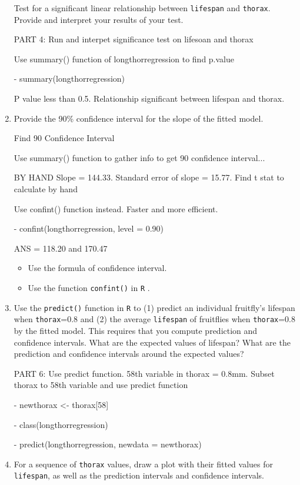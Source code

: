 \documentclass[12pt,letterpaper]{article}
\begin{document}
\begin{enumerate}
	Test for a significant linear relationship between  \texttt{lifespan} and \texttt{thorax}. Provide and interpret your results of your test.

PART 4: Run and interpet significance test on lifesoan and thorax

Use summary() function of longthorregression to find p.value

- summary(longthorregression)

 P value less than 0.5. Relationship significant between lifespan and thorax.
 	
\newpage
	\item
	
	Provide the 90\% confidence interval for the slope of the fitted model.
	
Find 90 Confidence Interval
	
Use summary() function to gather info to get 90 confidence interval...

BY HAND Slope = 144.33. Standard error of slope = 15.77. Find t stat to calculate by hand

Use confint() function instead. Faster and more efficient.
	
- confint(longthorregression, level = 0.90)

ANS = 118.20 and 170.47
			\vspace{.5cm}
	\begin{itemize}
		\item
		Use the formula of confidence interval.		\vspace{.5cm}
		\item
		Use the function  \texttt{confint()}  in \texttt{R} .
	\end{itemize}
			\vspace{6cm}
	\item Use the \texttt{predict()} function in \texttt{R} to (1) predict an individual fruitfly's lifespan when \texttt{thorax}=0.8 and (2) the average \texttt{lifespan} of fruitflies when \texttt{thorax}=0.8 by the fitted model. This requires that you compute prediction and confidence intervals. What are the expected values of lifespan? What are the prediction and confidence intervals around the expected values? 
	
	PART 6: Use predict function. 58th variable in thorax = 0.8mm. Subset thorax to 58th variable and use predict function
	
	- newthorax <- thorax[58]

- class(longthorregression)
	
	- predict(longthorregression, newdata = newthorax)
	
			\vspace{6cm}
	\item	For a sequence of \texttt{thorax} values, draw a plot with their fitted values for \texttt{lifespan}, as well as the prediction intervals and confidence intervals.



\end{enumerate}
\end{document}
